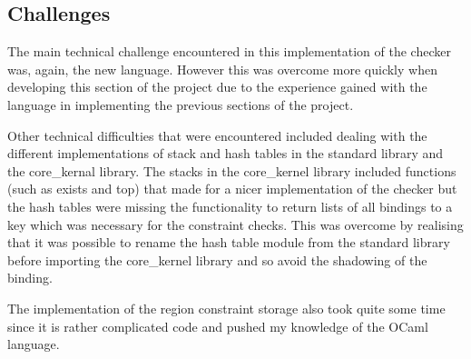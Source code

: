\subsection{Challenges}
The main technical challenge encountered in this implementation of the checker was, again, the new language. However this was overcome more quickly when developing this section of the project due to the experience gained with the language in implementing the previous sections of the project. 

Other technical difficulties that were encountered included dealing with the different implementations of stack and hash tables in the standard library and the core_kernal library. The stacks in the core_kernel library \cite{janest} included functions (such as exists and top) that made for a nicer implementation of the checker but the hash tables were missing the functionality to return lists of all bindings to a key which was necessary for the constraint checks. This was overcome by realising that it was possible to rename the hash table module from the standard library before importing the core_kernel library and so avoid the shadowing of the binding. 

The implementation of the region constraint storage also took quite some time since it is rather complicated code and pushed my knowledge of the OCaml language. 


